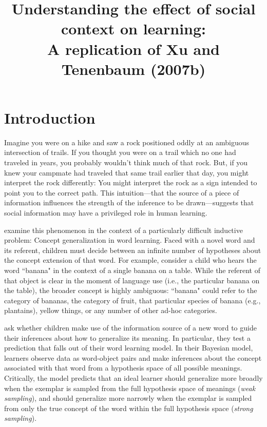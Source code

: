\documentclass[man]{apa2}
\title{Understanding the effect of social context on learning: \\ A replication of Xu and Tenenbaum (2007b)}
\begin{document}
\maketitle              


\section{Introduction}
Imagine you were on a hike and saw a rock positioned oddly at an ambiguous intersection of trails.  If you thought you were on a trail  which no one had traveled in years, you probably wouldn't think much of that rock. But, if you knew your  campmate had traveled that same trail earlier that day, you might interpret the rock differently: You might interpret the rock as a sign intended to point you to the correct path. This intuition---that the  source of a piece of information influences the strength of the inference to be drawn---suggests that social information may have a privileged role in human learning.

 examine this phenomenon in the context of a particularly difficult inductive problem: Concept generalization in word learning. Faced with a novel word and its referent, children must decide between an infinite number of hypotheses about the concept extension of that word. For example, consider a child who hears the word  ``banana" in the context of a single banana on a table. While the referent of that object is clear in the moment of language use (i.e., the particular banana on the table), the broader concept is highly ambiguous: ``banana" could refer to the category of bananas, the category of fruit, that particular species of banana (e.g., plantains), yellow things, or any number of other ad-hoc categories. 

 ask whether children make use of the information source of a new word to guide their inferences about how to generalize its meaning. In particular, they test a prediction that falls out of their word learning model. In their Bayesian model, learners observe data as word-object pairs and make inferences about the concept associated with that word from a hypothesis space of all possible meanings. Critically, the model predicts that  an ideal  learner should generalize more broadly when the exemplar is sampled from the full hypothesis space of meanings ({\it weak sampling}), and should generalize more narrowly when the exemplar is sampled from only  the true concept of the word within the full hypothesis space ({\it strong sampling}). 
\end{document}
